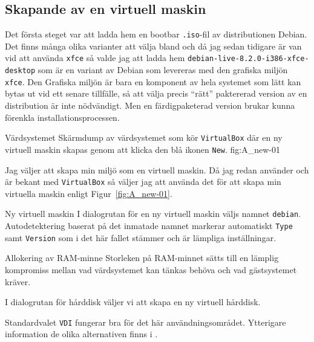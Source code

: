 \subsection{Skapande av en virtuell maskin}
Det första steget var att ladda hem en bootbar \texttt{.iso}-fil av
distributionen Debian. Det finns många olika varianter att välja bland och då
jag sedan tidigare är van vid att använda \texttt{xfce} så valde jag att ladda
hem \texttt{debian-live-8.2.0-i386-xfce-desktop} som är en variant av Debian
som levereras med den grafiska miljön \texttt{xfce}. Den Grafiska miljön är
bara en komponent av hela systemet som lätt kan bytas ut vid ett senare
tillfälle, så att välja precis ``rätt'' paktererad version av en distribution
är inte nödvändigt.  Men en färdigpaketerad version brukar kunna förenkla
installationsprocessen.

           {Värdsystemet}
           {Skärmdump av värdsystemet som kör \texttt{VirtualBox} där en ny
            virtuell maskin skapas genom att klicka den blå ikonen
            \texttt{New}.}
           {fig:A_new-01}

Jag väljer att skapa min miljö som en virtuell maskin. Då jag redan använder
och är bekant med \texttt{VirtualBox} så väljer jag att använda det för att
skapa min virtuella maskin enligt Figur~\ref{fig:A_new-01}.

           {Ny virtuell maskin}
           {I dialogrutan för en ny virtuell maskin väljs namnet
            \texttt{debian}. Autodetektering baserat på det inmatade
            namnet markerar automatiskt \texttt{Type} samt \texttt{Version}
            som i det här fallet stämmer och är lämpliga inställningar.}
           {}

           {Allokering av RAM-minne}
           {Storleken på RAM-minnet sätts till en lämplig kompromiss mellan
            vad värdsystemet kan tänkas behöva och vad gästsystemet kräver.}
           {}

           {}
           {I dialogrutan för hårddisk väljer vi att skapa en ny virtuell
            hårddisk.}
           {}

           {}
           {Standardvalet \texttt{VDI} fungerar bra för det här
            användningsområdet. Ytterigare information de olika alternativen
            finns i \cite{virtualbox:vdidetails}.}
           {}

